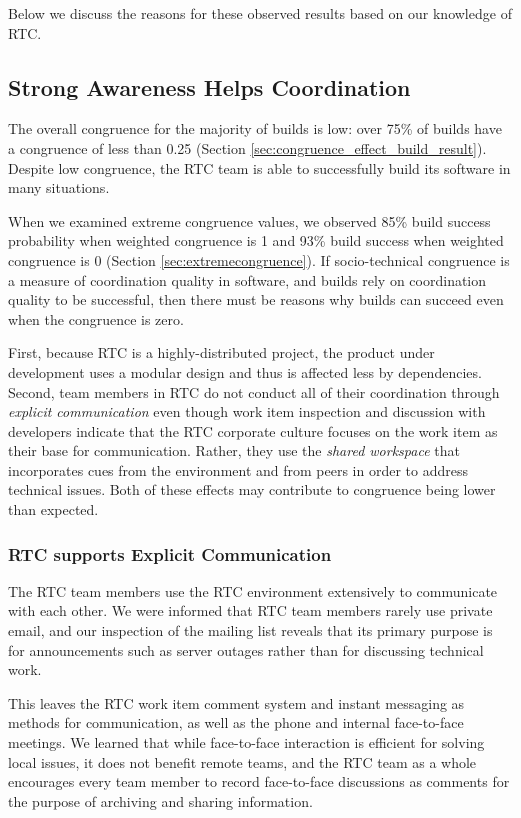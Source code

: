 Below we discuss the reasons for these observed results based on our knowledge of RTC.

\subsection{Strong Awareness Helps Coordination}
The overall congruence for the majority of builds is low: over 75\% of
builds have a congruence of less than 0.25 (Section \ref{sec:congruence_effect_build_result}).
Despite low congruence, the RTC team is able to successfully build its software in many situations.

When we examined extreme congruence values, we observed 85\% build success probability when weighted congruence is 1 and 93\% build success when weighted congruence is 0 (Section \ref{sec:extremecongruence}).
If socio-technical congruence is a measure of coordination quality in software, and builds rely on coordination quality to be successful, then there must be reasons why builds can succeed even when the congruence is zero.

First, because RTC is a highly-distributed project, the product under development uses a modular design \cite{maccormack2006} and thus is affected less by dependencies. Second, team members in RTC do not conduct all of their coordination through \emph{explicit communication} even though work item inspection and discussion with developers indicate that the RTC corporate culture focuses on the work item as their base for communication. Rather, they use the \emph{shared workspace} that incorporates cues from the environment and from peers in order to address technical issues. Both of these effects may contribute to congruence being lower than expected.

\subsubsection{RTC supports Explicit Communication}
The RTC team members use the RTC environment extensively to communicate with each other. We were informed that RTC team members rarely use private email, and our inspection of the mailing list reveals that its primary purpose is for announcements such as server outages rather than for discussing technical work.

This leaves the RTC work item comment system and instant messaging as methods for communication, as well as the phone and internal face-to-face meetings.
We learned that while face-to-face interaction is efficient for solving local issues, it does not benefit remote teams, and the RTC team as a whole encourages every team member to record face-to-face discussions as comments for the purpose of archiving and sharing information.

